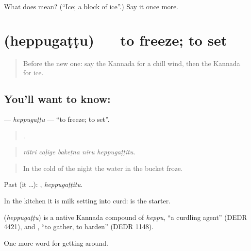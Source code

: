 \begin{tcolorbox}[breakable,colback=teal!4,colframe=teal!35!black,title={Before you move on}]
What does  mean? (\textquotedblleft{}Ice; a block of ice\textquotedblright{}.) Say it once more.
\end{tcolorbox}
\section[\texorpdfstring{\kn{ಹೆಪ್ಪುಗಟ್ಟು} (heppugaṭṭu)}{ಹೆಪ್ಪುಗಟ್ಟು (heppugaṭṭu)}]{ (heppugaṭṭu) — to freeze; to set}

\label{lesson:KA-C489-heppugattu}



\begin{quote}
Before the new one: say the Kannada for a chill wind, then the Kannada for ice.
\end{quote}

\subsection*{You'll want to know: }
\textbf{} — \emph{heppugaṭṭu} — \textquotedblleft{}to freeze; to set\textquotedblright{}.

\begin{quote}
    .
\end{quote}

\begin{quote}
\emph{rātri caḷige bakeṭna nīru heppugaṭṭitu.}
\end{quote}

\begin{quote}
In the cold of the night the water in the bucket froze.
\end{quote}

Past (it …): , \emph{heppugaṭṭitu}.

In the kitchen it is milk setting into curd:  is the starter.

\begin{cousinweb}
\textbf{} (\emph{heppugaṭṭu}) is a native Kannada compound of \emph{heppu}, \textquotedblleft{}a curdling agent\textquotedblright{} (DEDR 4421), and , \textquotedblleft{}to gather, to harden\textquotedblright{} (DEDR 1148).
\end{cousinweb}

\begin{grammarlens}[title={What you've built}]
One more word for getting around.
\end{grammarlens}

